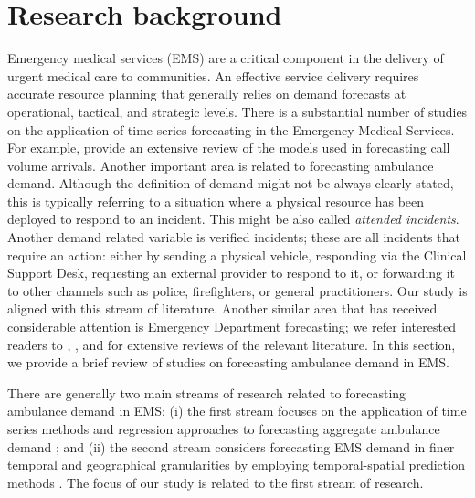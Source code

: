 \documentclass[
  authoryear,
  preprint,
  3p]{elsarticle}
\begin{document}
\hypertarget{sec-lit}{%
\section{Research background}\label{sec-lit}}

Emergency medical services (EMS) are a critical component in the
delivery of urgent medical care to communities. An effective service
delivery requires accurate resource planning that generally relies on
demand forecasts at operational, tactical, and strategic levels. There
is a substantial number of studies on the application of time series
forecasting in the Emergency Medical Services. For example,
\citet{ibrahim2016modeling} provide an extensive review of the models
used in forecasting call volume arrivals. Another important area is
related to forecasting ambulance demand. Although the definition of
demand might not be always clearly stated, this is typically referring
to a situation where a physical resource has been deployed to respond to
an incident. This might be also called \emph{attended incidents}.
Another demand related variable is verified incidents; these are all
incidents that require an action: either by sending a physical vehicle,
responding via the Clinical Support Desk, requesting an external
provider to respond to it, or forwarding it to other channels such as
police, firefighters, or general practitioners. Our study is aligned
with this stream of literature. Another similar area that has received
considerable attention is Emergency Department forecasting; we refer
interested readers to \citet{mingliterature2022},
\citet{gul2020exhaustive}, and \citet{wargon2009systematic} for
extensive reviews of the relevant literature. In this section, we
provide a brief review of studies on forecasting ambulance demand in
EMS.

There are generally two main streams of research related to forecasting
ambulance demand in EMS: (i) the first stream focuses on the application
of time series methods and regression approaches to forecasting
aggregate ambulance demand \citep{vile2012predicting, sasaki2010using};
and (ii) the second stream considers forecasting EMS demand in finer
temporal and geographical granularities by employing temporal-spatial
prediction methods \citep{zhou2016predicting, zhou2016predictinglit}.
The focus of our study is related to the first stream of research.
\end{document}
